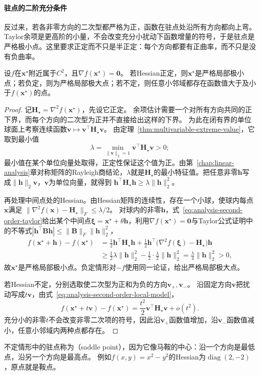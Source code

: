 \paragraph{驻点的二阶充分条件}
反过来，若各非零方向的二次型都严格为正，函数在驻点处沿所有方向都向上弯。Taylor余项是更高阶的小量，不会改变充分小扰动下函数增量的符号，于是驻点是严格极小点。这里要求正定而不只是半正定：每个方向都要有正曲率，而不只是没有负曲率。
\begin{theorem}[驻点的Hessian判别]
\label{thm:multivariable-hessian-classification}
设$f$在$\bm x^\star$附近属于$C^2$，且$\nabla f(\bm x^\star)=\bm 0$。
若Hessian正定，则$\bm x^\star$是严格局部极小点；若负定，则为严格局部极大点；若不定，则任意小邻域都存在函数值大于及小于$f(\bm x^\star)$的点。
\end{theorem}
\begin{proof}
记$\bm H_\star=\nabla^2f(\bm{x}^{\star})$，先设它正定。
余项估计需要一个对所有方向共同的正下界，而每个方向的二次型为正并不直接给出这样的下界。
为此在闭有界的单位球面上考察连续函数$\bm v\mapsto\bm v^\top\bm H_\star\bm v$。
由定理~\ref{thm:multivariable-extreme-value}，它取到最小值
\[
 \lambda=\min_{\lVert\bm v\rVert_2=1}\bm v^\top\bm H_\star\bm v>0;
\]
最小值在某个单位向量处取得，正定性保证这个值为正。由第~\ref{chap:linear-analysis}章对称矩阵的Rayleigh商结论，$\lambda$就是$\bm H_\star$的最小特征值。把任意非零$\bm h$写成$\lVert\bm h\rVert_2\bm v$，$\bm v$为单位向量，就得到
$\bm h^\top\bm H_\star\bm h\geq\lambda\lVert\bm h\rVert_2^2$。

再处理中间点处的Hessian。由Hessian矩阵的连续性，存在一个小球，使球内每点$\bm x$满足
$\lVert\nabla^2f(\bm x)-\bm H_\star\rVert_F\leq\lambda/2$。
对球内的非零$\bm h$，式~\eqref{eq:analysis-second-order-taylor}给出某个中间点$\bm\xi=\bm x^\star+\theta\bm h$，利用$\nabla f(\bm x^\star)=\bm 0$与Taylor公式证明中的不等式$|\bm h^\top\bm B\bm h|\leq\lVert\bm B\rVert_F\lVert\bm h\rVert_2^2$，
\[
 \begin{aligned}
 f(\bm{x}^{\star}+\bm{h})-f(\bm{x}^{\star})
 &=\frac12\bm h^\top\bm H_\star\bm h+\frac12\bm h^\top\bigl(\nabla^2f(\bm\xi)-\bm H_\star\bigr)\bm h\\
 &\geq\frac12\lambda\lVert\bm h\rVert_2^2-\frac12\cdot\frac{\lambda}{2}\lVert\bm h\rVert_2^2
 =\frac{\lambda}{4}\lVert\bm{h}\rVert_2^2>0,
 \end{aligned}
\]
故$\bm{x}^{\star}$是严格局部极小点。负定情形对$-f$使用同一论证，给出严格局部极大点。

若Hessian不定，分别选取使二次型为正和为负的方向$\bm v_+,\bm v_-$。
沿固定方向$\bm v$把扰动写成$t\bm v$，由式~\eqref{eq:analysis-second-order-local-model}，
\[
 f(\bm x^\star+t\bm v)-f(\bm x^\star)=\frac{t^2}{2}\bm v^\top\bm H_\star\bm v+o(t^2).
\]
充分小的非零$t$不会改变非零二次项的符号，因此沿$\bm v_+$函数值增加，沿$\bm v_-$函数值减小，任意小邻域内两种点都存在。
\end{proof}
不定情形中的驻点称为（saddle point），因为它像马鞍的中心：沿一个方向是最低点，沿另一个方向是最高点。
例如$f(x,y)=x^2-y^2$的Hessian为$\operatorname{diag}(2,-2)$，原点就是鞍点。

